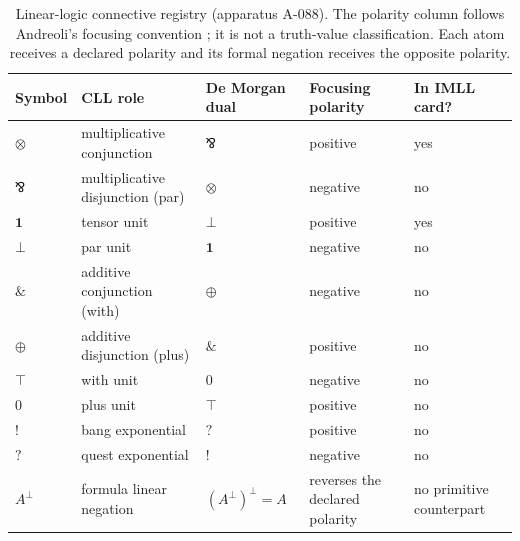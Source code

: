 \begin{table}[!htbp]
\centering
\begingroup\small
\setlength{\tabcolsep}{3pt}
\begin{tabular}{@{}p{}p{}p{}
  p{}p{}@{}}
\toprule
Symbol & CLL role & De Morgan dual & Focusing polarity & In IMLL card? \\
\midrule
\(\otimes\) & multiplicative conjunction & \(\bindnasrepma\) & positive & yes \\
\(\bindnasrepma\) & multiplicative disjunction (par) & \(\otimes\) & negative & no \\
\(\mathbf 1\) & tensor unit & \(\bot\) & positive & yes \\
\(\bot\) & par unit & \(\mathbf 1\) & negative & no \\
\(\mathbin{\&}\) & additive conjunction (with) & \(\oplus\) & negative & no \\
\(\oplus\) & additive disjunction (plus) & \(\mathbin{\&}\) & positive & no \\
\(\top\) & with unit & \(0\) & negative & no \\
\(0\) & plus unit & \(\top\) & positive & no \\
\(!\) & bang exponential & \(?\) & positive & no \\
\(?\) & quest exponential & \(!\) & negative & no \\
\(A^\perp\) & formula linear negation & \((A^\perp)^\perp=A\) & reverses
the declared polarity & no primitive counterpart \\
\bottomrule
\end{tabular}
\endgroup
\caption{Linear-logic connective registry (apparatus A-088).  The polarity
column follows Andreoli's focusing convention \cite{Andreoli1992}; it is not
a truth-value classification.  Each atom receives a declared polarity and its
formal negation receives the opposite polarity.}
\label{tab:p08-linear-connectives}
\end{table}


